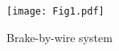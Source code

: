 


\begin{figure}[h!]
  \centering
  \texttt{[image: Fig1.pdf]}
  \caption{Brake-by-wire system}
  \label{bbwsys}
\end{figure}